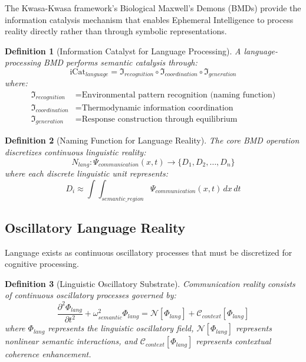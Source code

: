 \documentclass[12pt,a4paper]{article}
\newtheorem{definition}{Definition}
\begin{document}
The Kwasa-Kwasa framework's Biological Maxwell's Demons (BMDs) provide the information catalysis mechanism that enables Ephemeral Intelligence to process reality directly rather than through symbolic representations.

\begin{definition}[Information Catalyst for Language Processing]
A language-processing BMD performs semantic catalysis through:
\begin{equation}
\text{iCat}_{language} = \mathfrak{I}_{recognition} \circ \mathfrak{I}_{coordination} \circ \mathfrak{I}_{generation}
\end{equation}
where:
\begin{align}
\mathfrak{I}_{recognition} &= \text{Environmental pattern recognition (naming function)} \\
\mathfrak{I}_{coordination} &= \text{Thermodynamic information coordination} \\
\mathfrak{I}_{generation} &= \text{Response construction through equilibrium}
\end{align}
\end{definition}

\begin{definition}[Naming Function for Language Reality]
The core BMD operation discretizes continuous linguistic reality:
\begin{equation}
N_{lang}: \Psi_{communication}(x,t) \rightarrow \{D_1, D_2, \ldots, D_n\}
\end{equation}
where each discrete linguistic unit represents:
\begin{equation}
D_i \approx \int\int_{semantic\_region} \Psi_{communication}(x,t) \, dx \, dt
\end{equation}
\end{definition}

\subsection{Oscillatory Language Reality}

Language exists as continuous oscillatory processes that must be discretized for cognitive processing.

\begin{definition}[Linguistic Oscillatory Substrate]
Communication reality consists of continuous oscillatory processes governed by:
\begin{equation}
\frac{\partial^2 \Phi_{lang}}{\partial t^2} + \omega_{semantic}^2 \Phi_{lang} = \mathcal{N}[\Phi_{lang}] + \mathcal{C}_{context}[\Phi_{lang}]
\end{equation}
where $\Phi_{lang}$ represents the linguistic oscillatory field, $\mathcal{N}[\Phi_{lang}]$ represents nonlinear semantic interactions, and $\mathcal{C}_{context}[\Phi_{lang}]$ represents contextual coherence enhancement.
\end{definition}
\end{document}
